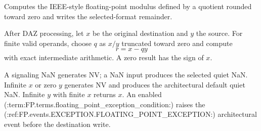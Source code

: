 Computes the IEEE-style floating-point modulus defined by a quotient rounded toward zero and writes the selected-format remainder.

After DAZ processing, let \(x\) be the original destination and \(y\) the source. For finite valid operands, choose \(q\) as \(x/y\) truncated toward zero and compute
\[
  r = x - qy
\]
with exact intermediate arithmetic. A zero result has the sign of \(x\).

A signaling NaN generates NV; a NaN input produces the selected quiet NaN. Infinite \(x\) or zero \(y\) generates NV and produces the architectural default quiet NaN. Infinite \(y\) with finite \(x\) returns \(x\). An enabled (:term:FP.terms.floating_point_exception_condition:) raises the (:ref:FP.events.EXCEPTION.FLOATING_POINT_EXCEPTION:) architectural event before the destination write.

